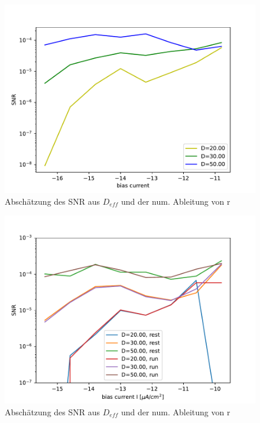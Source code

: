 \documentclass[12pt,a4paper]{article}
\begin{document}
\begin{figure}[H]
	\centering
	\includegraphics[scale=1]{snrangerealrinzel.pdf}\caption{Abschätzung des SNR aus $D_{eff}$ und der num. Ableitung von r}
	\label{rinzelabsch2}
\end{figure}
\begin{figure}[H]
	\centering
	\includegraphics[scale=1]{snronlyrinzelrealrinzel20ninv0.pdf}\caption{Abschätzung des SNR aus $D_{eff}$ und der num. Ableitung von r}
	\label{snr20n}
\end{figure}
\end{document}
